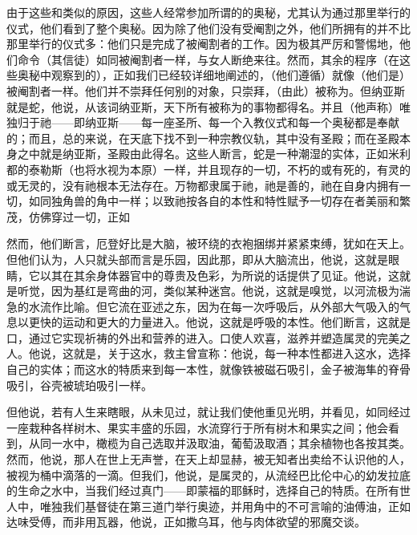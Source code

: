 由于这些和类似的原因，这些人经常参加所谓的的奥秘，尤其认为通过那里举行的仪式，他们看到了整个奥秘。因为除了他们没有受阉割之外，他们所拥有的并不比那里举行的仪式多：他们只是完成了被阉割者的工作。因为极其严厉和警惕地，他们命令（其信徒）如同被阉割者一样，与女人断绝来往。然而，其余的程序（在这些奥秘中观察到的），正如我们已经较详细地阐述的，（他们遵循）就像（他们是）被阉割者一样。他们并不崇拜任何别的对象，只崇拜，（由此）被称为。但纳亚斯就是蛇，他说，从该词纳亚斯，天下所有被称为的事物都得名。并且（他声称）唯独归于祂——即纳亚斯——每一座圣所、每一个入教仪式和每一个奥秘都是奉献的；而且，总的来说，在天底下找不到一种宗教仪轨，其中没有圣殿；而在圣殿本身之中就是纳亚斯，圣殿由此得名。这些人断言，蛇是一种潮湿的实体，正如米利都的泰勒斯（也将水视为本原）一样，并且现存的一切，不朽的或有死的，有灵的或无灵的，没有祂根本无法存在。万物都隶属于祂，祂是善的，祂在自身内拥有一切，如同独角兽的角中一样；以致祂按各自的本性和特性赋予一切存在者美丽和繁茂，仿佛穿过一切，正如\par

然而，他们断言，厄登好比是大脑，被环绕的衣袍捆绑并紧紧束缚，犹如在天上。但他们认为，人只就头部而言是乐园，因此那，即从大脑流出，他说，这就是眼睛，它以其在其余身体器官中的尊贵及色彩，为所说的话提供了见证。他说，这就是听觉，因为基红是弯曲的河，类似某种迷宫。他说，这就是嗅觉，以河流极为湍急的水流作比喻。但它流在亚述之东，因为在每一次呼吸后，从外部大气吸入的气息以更快的运动和更大的力量进入。他说，这就是呼吸的本性。他们断言，这就是口，通过它实现祈祷的外出和营养的进入。口使人欢喜，滋养并塑造属灵的完美之人。他说，这就是，关于这水，救主曾宣称：他说，每一种本性都进入这水，选择自己的实体；而这水的特质来到每一本性，就像铁被磁石吸引，金子被海隼的脊骨吸引，谷壳被琥珀吸引一样。\par

但他说，若有人生来瞎眼，从未见过，就让我们使他重见光明，并看见，如同经过一座栽种各样树木、果实丰盛的乐园，水流穿行于所有树木和果实之间；他会看到，从同一水中，橄榄为自己选取并汲取油，葡萄汲取酒；其余植物也各按其类。然而，他说，那人在世上无声誉，在天上却显赫，被无知者出卖给不认识他的人，被视为桶中滴落的一滴。但我们，他说，是属灵的，从流经巴比伦中心的幼发拉底的生命之水中，当我们经过真门——即蒙福的耶稣时，选择自己的特质。在所有世人中，唯独我们基督徒在第三道门举行奥迹，并用角中的不可言喻的油傅油，正如达味受傅，而非用瓦器，他说，正如撒乌耳，他与肉体欲望的邪魔交谈。\par

